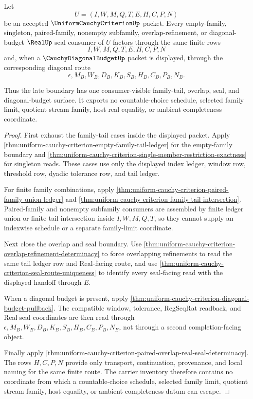 \begin{theorem}
\label{thm:uniform-cauchy-criterion-late-boundary-nochoice-exhaustion}
Let
$$
U=(I,W,M,Q,T,E,H,C,P,N)
$$
be an accepted $\UniformCauchyCriterionUp$ packet. Every empty-family, singleton, paired-family, nonempty subfamily, overlap-refinement, or diagonal-budget $\RealUp$-seal consumer of $U$ factors through the same finite rows
$$
I,W,M,Q,T,E,H,C,P,N
$$
and, when a $\CauchyDiagonalBudgetUp$ packet is displayed, through the corresponding diagonal route
$$
\epsilon,M_B,W_B,D_B,K_B,S_B,H_B,C_B,P_B,N_B.
$$

Thus the late boundary has one consumer-visible family-tail, overlap, seal, and diagonal-budget surface. It exports no countable-choice schedule, selected family limit, quotient stream family, host real equality, or ambient completeness coordinate.
\end{theorem}
\begin{proof}
First exhaust the family-tail cases inside the displayed packet. Apply \autoref{thm:uniform-cauchy-criterion-empty-family-tail-ledger} for the empty-family boundary and \autoref{thm:uniform-cauchy-criterion-single-member-restriction-exactness} for singleton reads. These cases use only the displayed index ledger, window row, threshold row, dyadic tolerance row, and tail ledger.

For finite family combinations, apply \autoref{thm:uniform-cauchy-criterion-paired-family-union-ledger} and \autoref{thm:uniform-cauchy-criterion-family-tail-intersection}. Paired-family and nonempty subfamily consumers are assembled by finite ledger union or finite tail intersection inside $I,W,M,Q,T$, so they cannot supply an indexwise schedule or a separate family-limit coordinate.

Next close the overlap and seal boundary. Use \autoref{thm:uniform-cauchy-criterion-overlap-refinement-determinacy} to force overlapping refinements to read the same tail ledger row and Real-facing route, and use \autoref{thm:uniform-cauchy-criterion-seal-route-uniqueness} to identify every seal-facing read with the displayed handoff through $E$.

When a diagonal budget is present, apply \autoref{thm:uniform-cauchy-criterion-diagonal-budget-pullback}. The compatible window, tolerance, RegSeqRat readback, and Real seal coordinates are then read through $\epsilon,M_B,W_B,D_B,K_B,S_B,H_B,C_B,P_B,N_B$, not through a second completion-facing object.

Finally apply \autoref{thm:uniform-cauchy-criterion-paired-overlap-real-seal-determinacy}. The rows $H,C,P,N$ provide only transport, continuation, provenance, and local naming for the same finite route. The carrier inventory therefore contains no coordinate from which a countable-choice schedule, selected family limit, quotient stream family, host equality, or ambient completeness datum can escape.
\end{proof}

